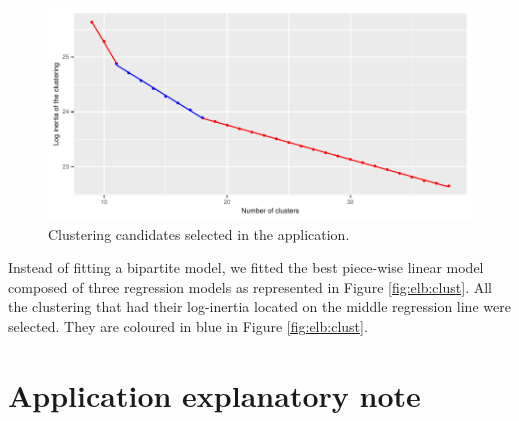 \begin{appendices}
\begin{figure}[H]
  \centering
  \includegraphics[]{figs/App/NB_CLUST.pdf}
  \caption{Clustering candidates selected in the application.}
  \label{fig:elb:clust2}
\end{figure}

Instead of fitting a bipartite model, we fitted the best piece-wise linear model composed of three regression models as represented in Figure \ref{fig:elb:clust}. All the clustering that had their log-inertia located on the middle regression line were selected. They are coloured in blue in Figure \ref{fig:elb:clust}.    

\section{Application explanatory note}\label{app:chap6:2}



\end{appendices}
